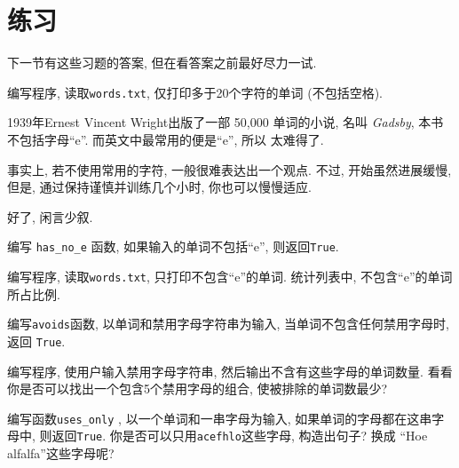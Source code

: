 \documentclass[10pt]{book}
\begin{document}
\section{练习}
下一节有这些习题的答案, 但在看答案之前最好尽力一试. 

\begin{exercise}
编写程序, 读取{\tt words.txt}, 仅打印多于20个字符的单词
(不包括空格). 

\end{exercise}

\begin{exercise}

1939年Ernest Vincent Wright出版了一部 50,000 单词的小说, 名叫
{\em Gadsby}, 本书不包括字母``e''. 而英文中最常用的便是``e'', 所以
太难得了. 

事实上, 若不使用常用的字符, 一般很难表达出一个观点. 
不过, 开始虽然进展缓慢, 但是, 通过保持谨慎并训练几个小时, 
你也可以慢慢适应. 

好了, 闲言少叙. 

编写 \verb"has_no_e" 函数, 如果输入的单词不包括``e'',  则返回{\tt True}. 

编写程序, 读取{\tt words.txt}, 只打印不包含``e''的单词. 
统计列表中, 不包含``e''的单词所占比例. 

\end{exercise}


\begin{exercise} 

编写{\tt avoids}函数, 以单词和禁用字母字符串为输入, 当单词不包含任何禁用字母时, 
返回 {\tt True}. 

编写程序, 使用户输入禁用字母字符串, 
然后输出不含有这些字母的单词数量. 
看看你是否可以找出一个包含5个禁用字母的组合, 
使被排除的单词数最少?

\end{exercise}


\begin{exercise}

编写函数\verb"uses_only" , 以一个单词和一串字母为输入, 
如果单词的字母都在这串字母中, 则返回{\tt True}.
你是否可以只用{\tt acefhlo}这些字母, 构造出句子?
换成 ``Hoe alfalfa''这些字母呢?

\end{exercise}
\end{document}
